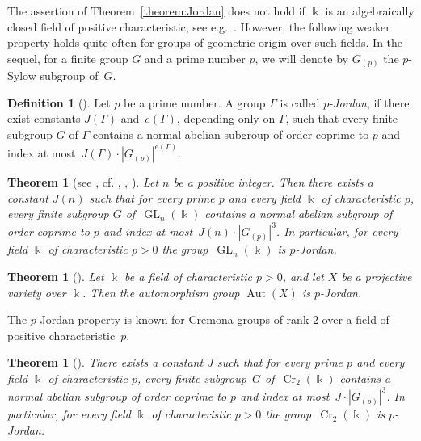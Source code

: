 \documentclass[12pt]{amsart}
\numberwithin{equation}{section}
\newtheorem{theorem}[subsection]{Theorem}
\theoremstyle{definition}
\newtheorem{definition}[subsection]{Definition}
\DeclareMathOperator{\Cr}{Cr}
\DeclareMathOperator{\Aut}{Aut}
\DeclareMathOperator{\GL}{GL}
\begin{document}
The assertion of Theorem~\ref{theorem:Jordan} does not hold
if $\Bbbk$ is an algebraically closed field of positive characteristic,
see e.g.~\mbox{\cite[\S1]{ChenShramov}}.
However, the following weaker property
holds quite often for groups of geometric origin over such fields.
In the sequel, for a finite group $G$ and a prime number $p$, we will denote by $G_{(p)}$
the $p$-Sylow subgroup of~$G$.

\begin{definition}[{\cite[Definition~1.6]{Hu}}]
\label{D:g-Jordan-2}
Let $p$ be a prime number. A group $\Gamma$ is called
$p$-\emph{Jordan}, if there exist constants
$J(\Gamma)$ and~\mbox{$e(\Gamma)$}, depending only on $\Gamma$, such that every finite subgroup
$G$ of $\Gamma$ contains a normal abelian subgroup of order coprime
to $p$ and index at most~\mbox{$J(\Gamma)\cdot |G_{(p)}|^{e(\Gamma)}$}.
\end{definition}


\begin{theorem}[{see \cite[Theorem~0.4]{LarsenPink}, cf. \cite{BrauerFeit}, \cite{Weisfeiler}, \cite{BajpaiDona}}]
\label{theorem:BrauerFeit}
Let $n$ be a positive integer. Then there
exists a constant $J(n)$ such that for every prime $p$ and every
field $\Bbbk$ of characteristic $p$, every finite subgroup
$G$ of~\mbox{$\GL_n(\Bbbk)$}
contains a normal abelian subgroup of order coprime
to $p$ and index at most~\mbox{$J(n)\cdot |G_{(p)}|^{3}$}.
In particular, for every field $\Bbbk$ of characteristic $p>0$
the group~\mbox{$\GL_n(\Bbbk)$} is $p$-Jordan.
\end{theorem}


\begin{theorem}[{\cite[Theorem~1.10]{Hu}}]
\label{theorem:Hu}
Let $\Bbbk$ be a field of characteristic $p>0$, and
let $X$ be a projective variety over $\Bbbk$.
Then the automorphism group $\Aut(X)$ is $p$-Jordan.
\end{theorem}

%

The $p$-Jordan property is  known for Cremona groups of rank $2$ over a field of positive characteristic~$p$.

\begin{theorem}[{\cite[Theorem~1.6]{ChenShramov}}]
\label{theorem:ChenShramov}
There exists a constant $J$ such that for every prime $p$ and every field $\Bbbk$ of characteristic $p$, every finite subgroup~$G$
of~\mbox{$\Cr_2(\Bbbk)$}
contains a normal abelian subgroup of order coprime
to $p$ and index at most~\mbox{$J\cdot |G_{(p)}|^{3}$}.
In particular, for every field $\Bbbk$ of characteristic $p>0$
the group~\mbox{$\Cr_2(\Bbbk)$} is $p$-Jordan.
\end{theorem}
\end{document}
